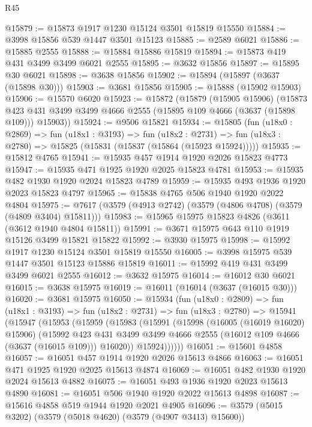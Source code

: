 \begin{lexlean}{R45}
\begin{coremodule}
@15879 := @15873 @1917 @1230 @15124 @3501 @15819 @15550
@15884 := @3998 @15856 @539 @1447 @3501 @15123
@15885 := @2589 @6021
@15886 := @15885 @2555
@15888 := @15884 @15886 @15819
@15894 := @15873 @419 @431 @3499 @3499 @6021 @2555
@15895 := @3632 @15856
@15897 := @15895 @30 @6021
@15898 := @3638 @15856
@15902 := @15894 (@15897 (@3637 (@15898 @30)))
@15903 := @3681 @15856
@15905 := @15888 (@15902 @15903)
@15906 := @15570 @6020
@15923 := @15872
    (@15879
      (@15905 @15906)
      (@15873 @423 @431 @3499 @3499 @4666 @2555 (@15895 @109 @4666 (@3637 (@15898 @109))) @15903))
@15924 := @9506 @15821
@15934 := @15805
    (fun (u18x0 : @2869) =>
    fun (u18x1 : @3193) =>
    fun (u18x2 : @2731) => fun (u18x3 : @2780) => @15825 (@15831 (@15837 (@15864 (@15923 @15924)))))
@15935 := @15812 @4765
@15941 := @15935 @457 @1914 @1920 @2026 @15823 @4773
@15947 := @15935 @471 @1925 @1920 @2025 @15823 @4781
@15953 := @15935 @482 @1930 @1920 @2024 @15823 @4789
@15959 := @15935 @493 @1936 @1920 @2023 @15823 @4797
@15965 := @15838 @4765 @506 @1940 @1920 @2022 @4804
@15975 := @7617 (@3579 (@4913 @2742) (@3579 (@4806 @4708) (@3579 (@4809 @3404) @15811)))
@15983 := @15965 @15975 @15823 @4826 (@3611 (@3612 @1940 @4804 @15811))
@15991 := @3671 @15975 @643 @110 @1919 @15126 @3499 @15821 @15822
@15992 := @3930 @15975
@15998 := @15992 @1917 @1230 @15124 @3501 @15819 @15550
@16005 := @3998 @15975 @539 @1447 @3501 @15123 @15886 @15819
@16011 := @15992 @419 @431 @3499 @3499 @6021 @2555
@16012 := @3632 @15975
@16014 := @16012 @30 @6021
@16015 := @3638 @15975
@16019 := @16011 (@16014 (@3637 (@16015 @30)))
@16020 := @3681 @15975
@16050 := @15934
    (fun (u18x0 : @2809) =>
    fun (u18x1 : @3193) =>
    fun (u18x2 : @2731) =>
    fun (u18x3 : @2780) =>
    @15941
      (@15947
        (@15953
          (@15959
            (@15983
              (@15991
                (@15998
                  (@16005 (@16019 @16020) @15906)
                  (@15992
                    @423
                    @431
                    @3499
                    @3499
                    @4666
                    @2555
                    (@16012 @109 @4666 (@3637 (@16015 @109)))
                    @16020))
                @15924))))))
@16051 := @15601 @4858
@16057 := @16051 @457 @1914 @1920 @2026 @15613 @4866
@16063 := @16051 @471 @1925 @1920 @2025 @15613 @4874
@16069 := @16051 @482 @1930 @1920 @2024 @15613 @4882
@16075 := @16051 @493 @1936 @1920 @2023 @15613 @4890
@16081 := @16051 @506 @1940 @1920 @2022 @15613 @4898
@16087 := @15616 @4858 @519 @1944 @1920 @2021 @4905
@16096 := @3579 (@5015 @3202) (@3579 (@5018 @4620) (@3579 (@4907 @3413) @15600))

\end{coremodule}
\end{lexlean}
